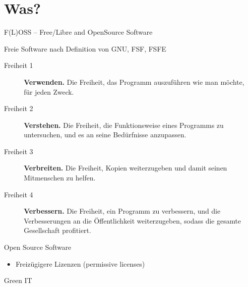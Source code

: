 \documentclass[t]{beamer}
\makeatletter
\newcommand{\strong}[1]{\@strong{#1}}
\newcommand{\@@strong}[1]{\textbf{\let\@strong\@@@strong#1}}
\newcommand{\@@@strong}[1]{\textnormal{\let\@strong\@@strong#1}}
\let\@strong\@@strong
\makeatother
\begin{document}
\section{Was?}

\begin{frame}{F(L)OSS -- Free/Libre and OpenSource Software}
    \begin{block}{Freie Software nach Definition von GNU, FSF, FSFE}
        \begin{description}
            \item[Freiheit 1] \strong{Verwenden.} {\small Die Freiheit,
                das Programm auszuführen wie man möchte, für jeden
                Zweck.}
            \item[Freiheit 2] \strong{Verstehen.} {\small Die Freiheit,
                die Funktionsweise eines Programms zu untersuchen, und
                es an seine Bedürfnisse anzupassen.}
            \item[Freiheit 3] \strong{Verbreiten.} {\small Die Freiheit,
                Kopien weiterzugeben und damit seinen Mitmenschen zu
                helfen.}
            \item[Freiheit 4] \strong{Verbessern.} {\small Die Freiheit,
                ein Programm zu verbessern, und die Verbesserungen
                an die Öffentlichkeit weiterzugeben, sodass die
                gesamte Gesellschaft profitiert.}
        \end{description}
    \end{block}
    \pause
    \begin{block}{Open Source Software}
        \begin{itemize}
            \item Freizügigere Lizenzen (permissive licenses)
        \end{itemize}
    \end{block}
\end{frame}

\begin{frame}[c]{Green IT}
    \begin{centering}
        \par
    \end{centering}
\end{frame}
\end{document}
